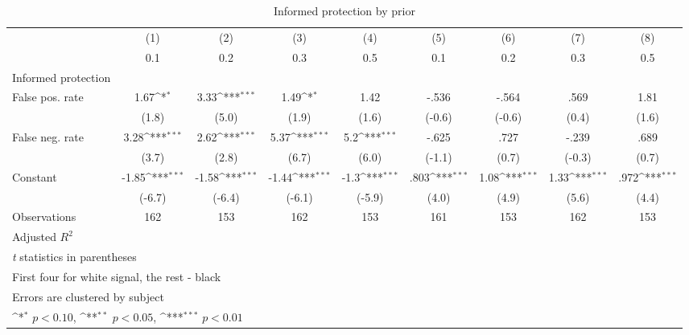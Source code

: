 \begin{table}[htbp]\centering
\def\sym#1{\ifmmode^{#1}\else\(^{#1}\)\fi}
\caption{Informed protection by prior}
\begin{tabular}{l*{8}{c}}
\hline\hline
                &\multicolumn{1}{c}{(1)}&\multicolumn{1}{c}{(2)}&\multicolumn{1}{c}{(3)}&\multicolumn{1}{c}{(4)}&\multicolumn{1}{c}{(5)}&\multicolumn{1}{c}{(6)}&\multicolumn{1}{c}{(7)}&\multicolumn{1}{c}{(8)}\\
                &\multicolumn{1}{c}{0.1}&\multicolumn{1}{c}{0.2}&\multicolumn{1}{c}{0.3}&\multicolumn{1}{c}{0.5}&\multicolumn{1}{c}{0.1}&\multicolumn{1}{c}{0.2}&\multicolumn{1}{c}{0.3}&\multicolumn{1}{c}{0.5}\\
\hline
Informed protection&                  &                  &                  &                  &                  &                  &                  &                  \\
False pos. rate &     1.67\sym{*}  &     3.33\sym{***}&     1.49\sym{*}  &     1.42         &    -.536         &    -.564         &     .569         &     1.81         \\
                &    (1.8)         &    (5.0)         &    (1.9)         &    (1.6)         &   (-0.6)         &   (-0.6)         &    (0.4)         &    (1.6)         \\
False neg. rate &     3.28\sym{***}&     2.62\sym{***}&     5.37\sym{***}&      5.2\sym{***}&    -.625         &     .727         &    -.239         &     .689         \\
                &    (3.7)         &    (2.8)         &    (6.7)         &    (6.0)         &   (-1.1)         &    (0.7)         &   (-0.3)         &    (0.7)         \\
Constant        &    -1.85\sym{***}&    -1.58\sym{***}&    -1.44\sym{***}&     -1.3\sym{***}&     .803\sym{***}&     1.08\sym{***}&     1.33\sym{***}&     .972\sym{***}\\
                &   (-6.7)         &   (-6.4)         &   (-6.1)         &   (-5.9)         &    (4.0)         &    (4.9)         &    (5.6)         &    (4.4)         \\
\hline
Observations    &      162         &      153         &      162         &      153         &      161         &      153         &      162         &      153         \\
Adjusted \(R^{2}\)&                  &                  &                  &                  &                  &                  &                  &                  \\
\hline\hline
\multicolumn{9}{l}{\footnotesize \textit{t} statistics in parentheses}\\
\multicolumn{9}{l}{\footnotesize First four for white signal, the rest - black}\\
\multicolumn{9}{l}{\footnotesize Errors are clustered by subject}\\
\multicolumn{9}{l}{\footnotesize \sym{*} \(p<0.10\), \sym{**} \(p<0.05\), \sym{***} \(p<0.01\)}\\
\end{tabular}
\end{table}
